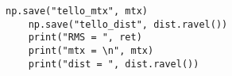 \begin{lstlisting}[caption=calibration code,label=calib_code]
    np.save("tello_mtx", mtx)                                                                                                                            
    np.save("tello_dist", dist.ravel())                                                                                                                  
    print("RMS = ", ret)                                                                                                                                 
    print("mtx = \n", mtx)                                                                                                                               
    print("dist = ", dist.ravel())                                                                                                                       
\end{lstlisting}